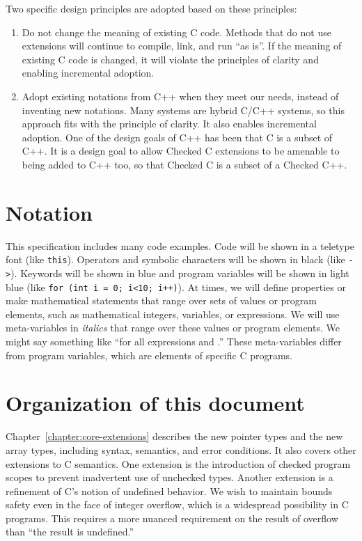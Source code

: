 Two specific design principles are adopted based on these principles:

\begin{enumerate}
\item
  Do not change the meaning of existing C code. Methods that do not use
  extensions will continue to compile, link, and run ``as is''. If the
  meaning of existing C code is changed, it will violate the principles
  of clarity and enabling incremental adoption.
\item
  Adopt existing notations from C++ when they meet our needs, instead of
  inventing new notations. Many systems are hybrid C/C++ systems, so
  this approach fits with the principle of clarity. It also enables
  incremental adoption. One of the design goals of C++ has been that C
  is a subset of C++.  It is a design goal to allow Checked C extensions
  to be amenable to being added to C++ too, so that Checked C is a subset
  of a Checked C++.
\end{enumerate}

\section{Notation}
This specification includes many code examples.   Code will be shown in a teletype font (like \texttt{\small this}).
Operators and symbolic characters will be shown in black (like \lstinline|->|).    Keywords will be shown in blue and program
variables will be shown in light blue (like \lstinline|for (int i = 0; i<10; i++)|).   At times, we will
define properties or make mathematical statements that range over sets of values or program
elements, such as mathematical integers, variables, or expressions.   We will use meta-variables in {\it italics} that
range over these values or program elements.  We might say something like
``for all expressions  and .''   These meta-variables
 differ from program variables, which are elements of specific C programs.

\section{Organization of this document}

Chapter~\ref{chapter:core-extensions} describes
the new pointer types and the new array types, including syntax,
semantics, and error conditions. It also covers other extensions to C
semantics. One extension is the introduction of checked program scopes to
prevent inadvertent use of unchecked types. Another extension is a
refinement of C's notion of undefined behavior. We wish to maintain
bounds safety even in the face of integer overflow, which is a
widespread possibility in C programs. This requires a more nuanced
requirement on the result of overflow than ``the result is undefined.''

